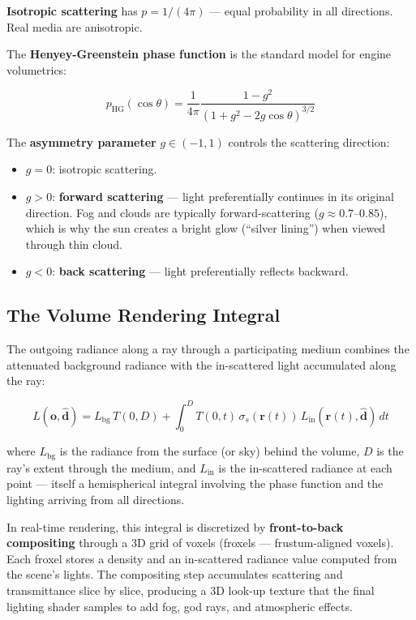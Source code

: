 \documentclass[
  11pt,
  letterpaper,
  DIV=11,
  numbers=noendperiod,
  twoside,
  open=right]{scrreprt}
\providecommand{\tightlist}{%
  \setlength{\itemsep}{0pt}\setlength{\parskip}{0pt}}
\begin{document}
\textbf{Isotropic scattering} has \(p = 1 / (4\pi)\) --- equal
probability in all directions. Real media are anisotropic.

The \textbf{Henyey-Greenstein phase function} is the standard model for
engine volumetrics:

\[
p_{\text{HG}}(\cos\theta) = \frac{1}{4\pi} \frac{1 - g^2}{(1 + g^2 - 2g\cos\theta)^{3/2}}
\]

The \textbf{asymmetry parameter} \(g \in (-1, 1)\) controls the
scattering direction:

\begin{itemize}
\tightlist
\item
  \(g = 0\): isotropic scattering.
\item
  \(g > 0\): \textbf{forward scattering} --- light preferentially
  continues in its original direction. Fog and clouds are typically
  forward-scattering (\(g \approx 0.7\)--\(0.85\)), which is why the sun
  creates a bright glow (``silver lining'') when viewed through thin
  cloud.
\item
  \(g < 0\): \textbf{back scattering} --- light preferentially reflects
  backward.
\end{itemize}

\subsection{The Volume Rendering
Integral}\label{the-volume-rendering-integral}

The outgoing radiance along a ray through a participating medium
combines the attenuated background radiance with the in-scattered light
accumulated along the ray:

\[
L(\mathbf{o}, \hat{\mathbf{d}}) = L_{\text{bg}} \, T(0, D) + \int_0^D T(0, t) \, \sigma_s(\mathbf{r}(t)) \, L_{\text{in}}(\mathbf{r}(t), \hat{\mathbf{d}}) \, dt
\]

where \(L_{\text{bg}}\) is the radiance from the surface (or sky) behind
the volume, \(D\) is the ray's extent through the medium, and
\(L_{\text{in}}\) is the in-scattered radiance at each point --- itself
a hemispherical integral involving the phase function and the lighting
arriving from all directions.

In real-time rendering, this integral is discretized by
\textbf{front-to-back compositing} through a 3D grid of voxels (froxels
--- frustum-aligned voxels). Each froxel stores a density and an
in-scattered radiance value computed from the scene's lights. The
compositing step accumulates scattering and transmittance slice by
slice, producing a 3D look-up texture that the final lighting shader
samples to add fog, god rays, and atmospheric effects.
\end{document}
